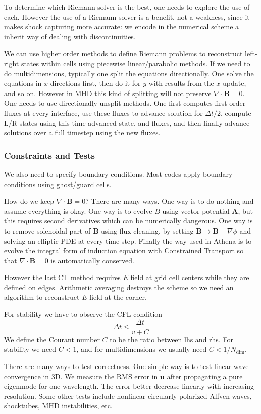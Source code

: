 \documentclass[letterpaper, 11pt]{article}
\numberwithin{equation}{section}
\numberwithin{figure}{section}
\begin{document}
To determine which Riemann solver is the best, one needs to explore the use of
each. However the use of a Riemann solver is a benefit, not a weakness, since it
makes shock capturing more accurate: we encode in the numerical scheme a inherit
way of dealing with discontinuities.

We can use higher order methods to define Riemann problems to reconstruct
left-right states within cells using piecewise linear/parabolic methods. If we
need to do multidimensions, typically one split the equations directionally. One
solve the equations in $x$ directions first, then do it for $y$ with results
from the $x$ update, and so on. However in MHD this kind of splitting will not
preserve $\nabla\cdot \mathbf{B} = 0$. One needs to use directionally unsplit
methods. One first computes first order fluxes at every interface, use these
fluxes to advance solution for $\Delta t/2$, compute L/R states using this
time-advanced state, and fluxes, and then finally advance solutions over a full
timestep using the new fluxes.

\subsubsection{Constraints and Tests}

We also need to specify boundary conditions. Most codes apply boundary
conditions using ghost/guard cells.

How do we keep $\nabla\cdot \mathbf{B} = 0$? There are many ways. One way is to
do nothing and assume everything is okay. One way is to evolve $B$ using vector
potential $\mathbf{A}$, but this requires second derivatives which can be
numerically dangerous. One way is to remove solenoidal part of $\mathbf{B}$
using flux-cleaning, by setting $\mathbf{B} \to \mathbf{B} - \nabla\phi$ and
solving an elliptic PDE at every time step. Finally the way used in Athena is to
evolve the integral form of induction equation with Constrained Transport so
that $\nabla\cdot \mathbf{B} = 0$ is automatically conserved.

However the last CT method requires $E$ field at grid cell centers while they
are defined on edges. Arithmetic averaging destroys the scheme so we need an
algorithm to reconstruct $E$ field at the corner.

For stability we have to observe the CFL condition
\begin{equation}
  \label{eq:13}
  \Delta t \leq \frac{\Delta t}{v + C}
\end{equation}
We define the Courant number $C$ to be the ratio between lhs and rhs. For
stability we need $C<1$, and for multidimensions we usually need $C <
1/N_\text{dim}$.

There are many ways to test correctness. One simple way is to test linear wave
convergence in 3D. We measure the RMS error in $\mathbf{u}$ after propagating
a pure eigenmode for one wavelength. The error better decrease linearly with
increasing resolution. Some other tests include nonlinear circularly polarized
Alfven waves, shocktubes, MHD instabilities, etc.
\end{document}
